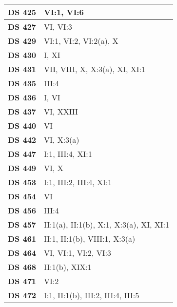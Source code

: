 \begin{xltabular}{\linewidth}{ l | X }
    \textbf {DS 425} & VI:1, VI:6 \\ \hline

    \textbf {DS 427} & VI, VI:3 \\ \hline

    \textbf {DS 429} & VI:1, VI:2, VI:2(a), X \\ \hline

    \textbf {DS 430} & I, XI \\ \hline

    \textbf {DS 431} & VII, VIII, X, X:3(a), XI, XI:1 \\ \hline

    \textbf {DS 435} & III:4 \\ \hline

    \textbf {DS 436} & I, VI \\ \hline

    \textbf {DS 437} & VI, XXIII \\ \hline

    \textbf {DS 440} & VI \\ \hline

    \textbf {DS 442} & VI, X:3(a) \\ \hline

    \textbf {DS 447} & I:1, III:4, XI:1 \\ \hline

    \textbf {DS 449} & VI, X \\ \hline

    \textbf {DS 453} & I:1, III:2, III:4, XI:1 \\ \hline

    \textbf {DS 454} & VI \\ \hline

    \textbf {DS 456} & III:4 \\ \hline

    \textbf {DS 457} & II:1(a), II:1(b), X:1, X:3(a), XI, XI:1 \\ \hline

    \textbf {DS 461} & II:1, II:1(b), VIII:1, X:3(a) \\ \hline

    \textbf {DS 464} & VI, VI:1, VI:2, VI:3 \\ \hline

    \textbf {DS 468} & II:1(b), XIX:1 \\ \hline

    \textbf {DS 471} & VI:2 \\ \hline

    \textbf {DS 472} & I:1, II:1(b), III:2, III:4, III:5 \\ \hline


\end{xltabular}

